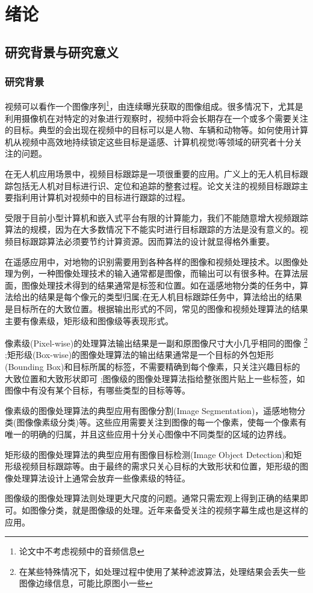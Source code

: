 
\chapter{绪论}

\section{研究背景与研究意义}
\subsection{研究背景}

视频可以看作一个图像序列\footnote{论文中不考虑视频中的音频信息}，由连续曝光获取的图像组成。很多情况下，尤其是利用摄像机在对特定的对象进行观察时，视频中将会长期存在一个或多个需要关注的目标。典型的会出现在视频中的目标可以是人物、车辆和动物等。如何使用计算机从视频中高效地持续锁定这些目标是遥感、计算机视觉l等领域的研究者十分关注的问题。
\par
在无人机应用场景中，视频目标跟踪是一项很重要的应用。广义上的无人机目标跟踪包括无人机对目标进行识、定位和追踪的整套过程。论文关注的视频目标跟踪主要指利用计算机对视频中的目标进行跟踪的过程。
\par
受限于目前小型计算机和嵌入式平台有限的计算能力，我们不能随意增大视频跟踪算法的规模，因为在大多数情况下不能实时进行目标跟踪的方法是没有意义的。视频目标跟踪算法必须要节约计算资源。因而算法的设计就显得格外重要。
\par
在遥感应用中，对地物的识别需要用到各种各样的图像和视频处理技术。以图像处理为例，一种图像处理技术的输入通常都是图像，而输出可以有很多种。在算法层面，图像处理技术得到的结果通常是标签和位置。如在遥感地物分类的任务中，算法给出的结果是每个像元的类型归属;在无人机目标跟踪任务中，算法给出的结果是目标所在的大致位置。根据输出形式的不同，常见的图像和视频处理算法的结果主要有像素级，矩形级和图像级等表现形式。
\par
像素级(Pixel-wise)的处理算法输出结果是一副和原图像尺寸大小几乎相同的图像
\footnote{在某些特殊情况下，如处理过程中使用了某种滤波算法，处理结果会丢失一些图像边缘信息，可能比原图小一些}
;矩形级(Box-wise)的图像处理算法的输出结果通常是一个目标的外包矩形(Bounding Box)和目标所属的标签，不需要精确到每个像素，只关注兴趣目标的大致位置和大致形状即可
;图像级的图像处理算法指给整张图片贴上一些标签，如图像中有没有某个目标，有哪些类型的目标等等。
\par
像素级的图像处理算法的典型应用有图像分割(Image Segmentation)，遥感地物分类(图像像素级分类)等。这些应用需要关注到图像的每一个像素，使每一个像素有唯一的明确的归属，并且这些应用十分关心图像中不同类型的区域的边界线。
\par
矩形级的图像处理算法的典型应用有图像目标检测(Image Object Detection)和矩形级视频目标跟踪等。由于最终的需求只关心目标的大致形状和位置，矩形级的图像处理算法设计上通常会放弃一些像素级的特征。
\par
图像级的图像处理算法则处理更大尺度的问题。通常只需宏观上得到正确的结果即可。如图像分类\supercite{imagenet_cvpr09}，就是图像级的处理。近年来备受关注的视频字幕生成\supercite{aswin2019nlp}也是这样的应用。


